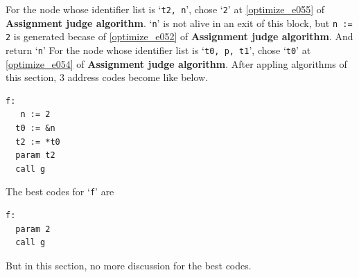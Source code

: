\begin{Example}
For the node whose identifier list is `{\tt{t2, n}}',
chose `{\tt{2}}' at \ref{optimize_e055} of {\bf Assignment judge algorithm}.
`{\tt{n}}' is not alive in an exit of this block,
but {\tt{n := 2}} is generated becase of \ref{optimize_e052}
of {\bf Assignment judge algorithm}. And return `{\tt{n}}'
For the node whose identifier list is `{\tt{t0, p, t1}}',
chose `{\tt{t0}}' at \ref{optimize_e054} of {\bf Assignment judge algorithm}.
After appling algorithms of this section,
3 address codes become like below.
\begin{verbatim}
f:
   n := 2
  t0 := &n
  t2 := *t0
  param t2
  call g
\end{verbatim}
The best codes for `{\tt{f}}' are
\begin{verbatim}
f:
  param 2
  call g
\end{verbatim}
But in this section, no more discussion for the best codes.
\end{Example}

